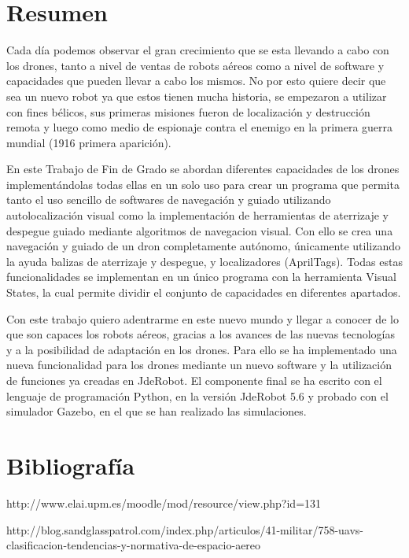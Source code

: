 \documentclass[a4paper, 12pt, oneside]{book}
\begin{document}
\chapter*{Resumen}
\hspace{1cm} Cada día podemos observar el gran crecimiento que se esta llevando a cabo con los drones, tanto a nivel de ventas de robots aéreos como a nivel de software y capacidades que pueden llevar a cabo los mismos. No por esto quiere decir que sea un nuevo robot ya que estos tienen mucha historia, se empezaron a utilizar con fines bélicos, sus primeras misiones fueron de localización y destrucción remota y luego como medio de espionaje contra el enemigo en la primera guerra mundial (1916 primera aparición).

\hspace{1cm} En este Trabajo de Fin de Grado se abordan diferentes capacidades de los drones implementándolas todas ellas en un solo uso para crear un programa que permita tanto el uso sencillo de softwares de navegación y guiado utilizando autolocalización visual como la implementación de herramientas de aterrizaje y despegue guiado mediante algoritmos de navegacion visual. Con ello se crea una navegación y guiado de un dron completamente autónomo, únicamente utilizando la ayuda balizas de aterrizaje y despegue, y localizadores (AprilTags). Todas estas funcionalidades se implementan en un único programa con la herramienta Visual States, la cual permite dividir el conjunto de capacidades en diferentes apartados.

\hspace{1cm} Con este trabajo quiero adentrarme en este nuevo mundo y llegar a conocer de lo que son capaces los robots aéreos, gracias a los avances de las nuevas tecnologías y a la posibilidad de adaptación en los drones. Para ello se ha implementado una nueva funcionalidad para los drones mediante un nuevo software y la utilización de funciones ya creadas en JdeRobot. El componente final se ha escrito con el lenguaje de programación Python, en la versión JdeRobot 5.6 y probado con el simulador Gazebo, en el que se han realizado las simulaciones.

\renewcommand{\tablename}{Tabla}
\tableofcontents %

\listoffigures %
\cleardoublepage

\pagestyle{fancy}
\setlength{\parindent}{6mm}








\chapter{Bibliografía}

http://www.elai.upm.es/moodle/mod/resource/view.php?id=131

http://blog.sandglasspatrol.com/index.php/articulos/41-militar/758-uavs-clasificacion-tendencias-y-normativa-de-espacio-aereo
\end{document}

